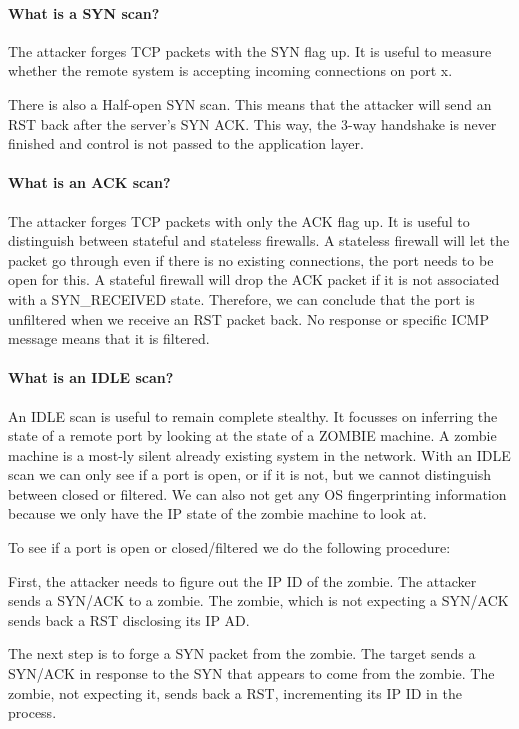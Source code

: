 \paragraph{What is a SYN scan?}
The attacker forges TCP packets with the SYN flag up. It is useful to measure whether the remote system is accepting incoming connections on port x.

There is also a Half-open SYN scan. This means that the attacker will send an RST back after the server's SYN ACK. This way, the 3-way handshake is never finished and control is not passed to the application layer.

\paragraph{What is an ACK scan?}
The attacker forges TCP packets with only the ACK flag up. It is useful to distinguish between stateful and stateless firewalls. A stateless firewall will let the packet go through even if there is no existing connections, the port needs to be open for this. A stateful firewall will drop the ACK packet if it is not associated with a SYN\_RECEIVED state. Therefore, we can conclude that the port is unfiltered when we receive an RST packet back. No response or specific ICMP message means that it is filtered.

\paragraph{What is an IDLE scan?}
An IDLE scan is useful to remain complete stealthy. It focusses on inferring the state of a remote port by looking at the state of a ZOMBIE machine. A zombie machine is a most-ly silent already existing system in the network. With an IDLE scan we can only see if a port is open, or if it is not, but we cannot distinguish between closed or filtered. We can also not get any OS fingerprinting information because we only have the IP state of the zombie machine to look at.

To see if a port is open or closed/filtered we do the following procedure:

First, the attacker needs to figure out the IP ID of the zombie. The attacker sends a SYN/ACK to a zombie. The zombie, which is not expecting a SYN/ACK sends back a RST disclosing its IP AD.

The next step is to forge a SYN packet from the zombie. The target sends a SYN/ACK in response to the SYN that appears to come from the zombie. The zombie, not expecting it, sends back a RST, incrementing its IP ID in the process. 

